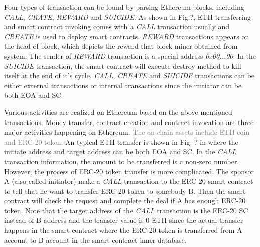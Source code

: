 Four types of transaction can be found by parsing Ethereum blocks, including \emph{CALL}, \emph{CRATE}, \emph{REWARD} and \emph{SUICIDE}. As shown in Fig.?, ETH transferring and smart contract invoking comes with a \emph{CALL} transaction usually and \emph{CREATE} is used to deploy smart contracts. \emph{REWARD} transactions appears on the head of block, which depicts the reward that block miner obtained from system. The sender of \emph{REWARD} transaction is a special address \emph{0x00...00}. In the \emph{SUICIDE} transaction, the smart contract will execute destroy method to kill itself at the end of it's cycle. \emph{CALL}, \emph{CREATE} and \emph{SUICIDE} transactions can be either external transactions or internal transactions since the initiator can be both EOA and SC.

Various activities are realized on Ethereum based on the above mentioned transactions. Money transfer, contract creation and contract invocation are three major activities happening on Ethereum\cite{chen2018infocom}. \textcolor{gray}{The on-chain assets include ETH coin and ERC-20 token.} An typical ETH transfer is shown in Fig. ? in where the initiate address and target address can be both EOA and SC. In the \emph{CALL} transaction information, the amount to be transferred is a non-zero number. However, the process of ERC-20 token transfer is more complicated. The sponsor A (also called initiator) make a \emph{CALL} transaction to the ERC-20 smart contract to tell that he want to transfer ERC-20 token to somebody B. Then the smart contract will check the request and complete the deal if A has enough ERC-20 token. Note that the target address of the \emph{CALL} transaction is the ERC-20 SC instead of B address and the transfer value is $0$ ETH since the actual transfer happens in the smart contract where the ERC-20 token is transferred from A account to B account in the smart contract inner database. 


